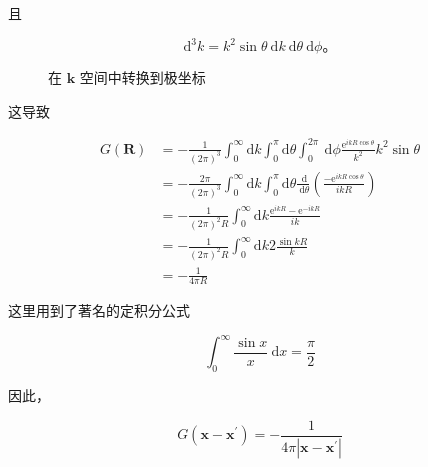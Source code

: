 且

$$
\mathrm{d}^{3} k=k^{2} \sin \theta \mathrm{~d} k \mathrm{~d} \theta \mathrm{~d} \phi。
$$
\begin{figure}
  \centering
  \caption{在 $\mathbf{k}$ 空间中转换到极坐标}
  \label{12.2}
\end{figure}


这导致

$$
\begin{aligned}
G(\mathbf{R}) & =-\frac{1}{(2 \pi)^{3}} \int_{0}^{\infty} \mathrm{d} k \int_{0}^{\pi} \mathrm{d} \theta \int_{0}^{2 \pi} \mathrm{~d} \phi \frac{\mathrm{e}^{i k R \cos \theta}}{k^{2}} k^{2} \sin \theta \\
& =-\frac{2 \pi}{(2 \pi)^{3}} \int_{0}^{\infty} \mathrm{d} k \int_{0}^{\pi} \mathrm{d} \theta \frac{\mathrm{~d}}{\mathrm{~d} \theta}\left(\frac{-\mathrm{e}^{i k R \cos \theta}}{i k R}\right) \\
& =-\frac{1}{(2 \pi)^{2} R} \int_{0}^{\infty} \mathrm{d} k \frac{\mathrm{e}^{i k R}-\mathrm{e}^{-i k R}}{i k} \\
& =-\frac{1}{(2 \pi)^{2} R} \int_{0}^{\infty} \mathrm{d} k 2 \frac{\sin k R}{k} \\
& =-\frac{1}{4 \pi R}
\end{aligned}
$$

这里用到了著名的定积分公式

$$
\int_{0}^{\infty} \frac{\sin x}{x} \mathrm{~d} x=\frac{\pi}{2}
$$

因此，

\begin{equation}\label{eq:12.18} 
 G\left(\mathbf{x}-\mathbf{x}^{\prime}\right)=-\frac{1}{4 \pi\left|\mathbf{x}-\mathbf{x}^{\prime}\right|} 
 \end{equation}

